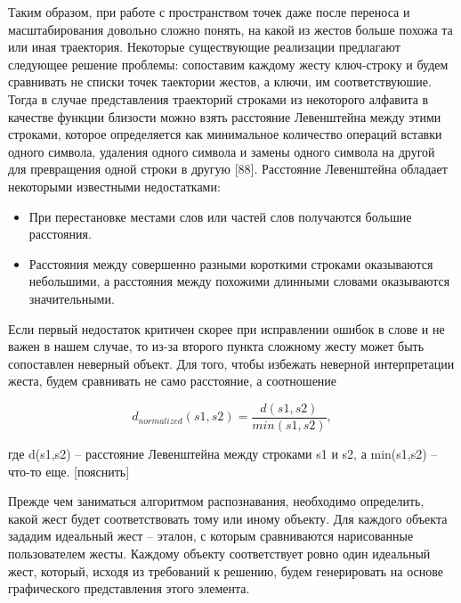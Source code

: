 \documentclass[a5paper]{article}
\begin{document}
Таким образом, при работе с пространством точек даже после переноса и масштабирования довольно сложно понять, на какой из жестов 
больше похожа та или иная траектория. Некоторые существующие реализации предлагают следующее решение проблемы: сопоставим каждому жесту 
ключ-строку и будем сравнивать не списки точек таектории жестов, а ключи, им соответствуюшие. Тогда в случае представления траекторий 
строками из некоторого алфавита в качестве функции близости можно взять расстояние Левенштейна 
между этими строками, которое определяется как минимальное количество операций вставки одного символа, удаления одного символа и замены 
одного символа на другой для превращения одной строки в другую [88]. Расстояние Левенштейна обладает некоторыми известными недостатками:
\begin{itemize}
  \item При перестановке местами слов или частей слов получаются большие расстояния.
  \item Расстояния между совершенно разными короткими строками оказываются небольшими, а расстояния между похожими длинными словами 
оказываются значительными.
\end{itemize}
Если первый недостаток критичен скорее при исправлении ошибок в слове и не важен в нашем случае, то из-за второго пункта сложному 
жесту может быть сопоставлен неверный объект. Для того, чтобы избежать неверной интерпретации жеста, будем сравнивать не само расстояние, 
а соотношение 

\begin{equation}
\label{levenshtein}
d_{normalized}(s1,s2) = \frac{d(s1,s2)}{min(s1,s2)},
\end{equation}

где d(s1,s2) -- расстояние Левенштейна между строками s1 и s2, а min(s1,s2) -- что-то еще. [пояснить]

Прежде чем заниматься алгоритмом распознавания, необходимо определить, какой жест будет соответствовать тому или иному объекту. Для каждого 
объекта зададим идеальный жест -- эталон, с которым сравниваются нарисованные пользователем жесты. Каждому объекту соответствует ровно один 
идеальный жест, который, исходя из требований к решению, будем генерировать на основе графического представления этого элемента. 
\end{document}
